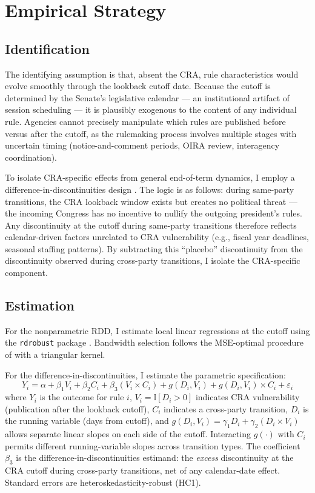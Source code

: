 \documentclass[12pt]{article}
\newcommand{\ind}{\mathbb{I}}
\begin{document}
\section{Empirical Strategy}

\subsection{Identification}

The identifying assumption is that, absent the CRA, rule characteristics would evolve smoothly through the lookback cutoff date. Because the cutoff is determined by the Senate's legislative calendar --- an institutional artifact of session scheduling --- it is plausibly exogenous to the content of any individual rule. Agencies cannot precisely manipulate which rules are published before versus after the cutoff, as the rulemaking process involves multiple stages with uncertain timing (notice-and-comment periods, OIRA review, interagency coordination).

To isolate CRA-specific effects from general end-of-term dynamics, I employ a difference-in-discontinuities design \citep{grembi2016}. The logic is as follows: during same-party transitions, the CRA lookback window exists but creates no political threat --- the incoming Congress has no incentive to nullify the outgoing president's rules. Any discontinuity at the cutoff during same-party transitions therefore reflects calendar-driven factors unrelated to CRA vulnerability (e.g., fiscal year deadlines, seasonal staffing patterns). By subtracting this ``placebo'' discontinuity from the discontinuity observed during cross-party transitions, I isolate the CRA-specific component.

\subsection{Estimation}

For the nonparametric RDD, I estimate local linear regressions at the cutoff using the \texttt{rdrobust} package \citep{calonico2014}. Bandwidth selection follows the MSE-optimal procedure of \citet{calonico2014} with a triangular kernel.

For the difference-in-discontinuities, I estimate the parametric specification:
\begin{equation}
Y_i = \alpha + \beta_1 V_i + \beta_2 C_i + \beta_3 (V_i \times C_i) + g(D_i, V_i) + g(D_i, V_i) \times C_i + \varepsilon_i
\label{eq:did}
\end{equation}
where $Y_i$ is the outcome for rule $i$, $V_i = \ind[D_i > 0]$ indicates CRA vulnerability (publication after the lookback cutoff), $C_i$ indicates a cross-party transition, $D_i$ is the running variable (days from cutoff), and $g(D_i, V_i) = \gamma_1 D_i + \gamma_2 (D_i \times V_i)$ allows separate linear slopes on each side of the cutoff. Interacting $g(\cdot)$ with $C_i$ permits different running-variable slopes across transition types. The coefficient $\beta_3$ is the difference-in-discontinuities estimand: the \textit{excess} discontinuity at the CRA cutoff during cross-party transitions, net of any calendar-date effect. Standard errors are heteroskedasticity-robust (HC1).
\end{document}
